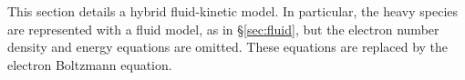 This section details a hybrid fluid-kinetic model.  In particular, the
heavy species are represented with a fluid model, as in
\S\ref{sec:fluid}, but the electron number density and energy
equations are omitted.  These equations are replaced by the electron
Boltzmann equation.
